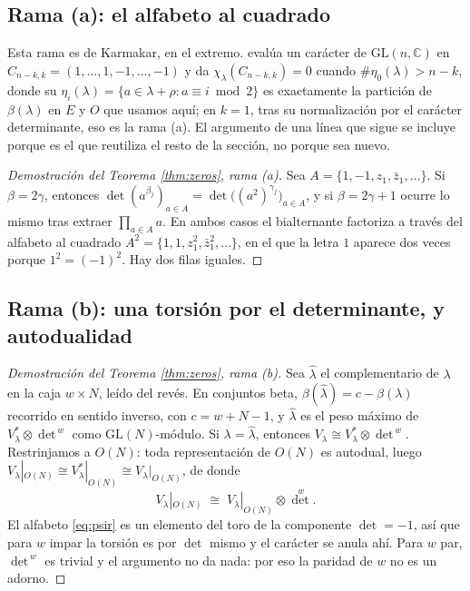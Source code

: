 \documentclass[11pt,reqno]{amsart}
\theoremstyle{plain}
\theoremstyle{definition}
\newcommand{\CC}{\mathbb{C}}
\begin{document}
\subsection{Rama (a): el alfabeto al cuadrado}\label{sec:brancha}

Esta rama es de Karmakar, en el extremo. \cite[Teorema 4.1(A)]{Kar24} evalúa un carácter de
$\mathrm{GL}(n,\CC)$ en $C_{n-k,k}=(1,\dots,1,-1,\dots,-1)$ y da
$\chi_\lambda(C_{n-k,k})=0$ cuando $\#\eta_0(\lambda)>n-k$, donde su
$\eta_i(\lambda)=\{a\in\lambda+\rho: a\equiv i \bmod 2\}$ es exactamente la partición de
$\beta(\lambda)$ en $E$ y $O$ que usamos aquí; en $k=1$, tras su normalización por el carácter
determinante, eso es la rama (a). El argumento de una línea que sigue se incluye porque es el que
reutiliza el resto de la sección, no porque sea nuevo.

\begin{proof}[Demostración del Teorema \ref{thm:zeros}, rama {\rm(a)}]
Sea $A=\{1,-1,z_1,\bar z_1,\dots\}$. Si $\beta=2\gamma$, entonces
$\det(a^{\beta_j})_{a\in A}=\det\big((a^2)^{\gamma_j}\big)_{a\in A}$, y si $\beta=2\gamma+1$ ocurre lo
mismo tras extraer $\prod_{a\in A}a$. En ambos casos el bialternante factoriza a través del alfabeto
al cuadrado $A^2=\{1,1,z_1^{2},\bar z_1^{2},\dots\}$, en el que la letra $1$ aparece dos veces porque
$1^2=(-1)^2$. Hay dos filas iguales.
\end{proof}

\subsection{Rama (b): una torsión por el determinante, y autodualidad}

\begin{proof}[Demostración del Teorema \ref{thm:zeros}, rama {\rm(b)}]
Sea $\hat\lambda$ el complementario de $\lambda$ en la caja $w\times N$, leído del revés. En
conjuntos beta, $\beta(\hat\lambda)=c-\beta(\lambda)$ recorrido en sentido inverso, con $c=w+N-1$, y
$\hat\lambda$ es el peso máximo de $V_\lambda^{*}\otimes\det^{\,w}$ como $\mathrm{GL}(N)$-módulo. Si
$\lambda=\hat\lambda$, entonces $V_\lambda\cong V_\lambda^{*}\otimes\det^{\,w}$. Restrinjamos a
$O(N)$: toda representación de $O(N)$ es autodual, luego
$V_\lambda|_{O(N)}\cong V_\lambda^{*}|_{O(N)}\cong V_\lambda|_{O(N)}$, de donde
\[
V_\lambda|_{O(N)}\;\cong\;V_\lambda|_{O(N)}\otimes\det^{\,w}.
\]
El alfabeto \eqref{eq:psir} es un elemento del toro de la componente $\det=-1$, así que para $w$
impar la torsión es por $\det$ mismo y el carácter se anula ahí. Para $w$ par, $\det^{\,w}$ es
trivial y el argumento no da nada: por eso la paridad de $w$ no es un adorno.
\end{proof}
\end{document}
